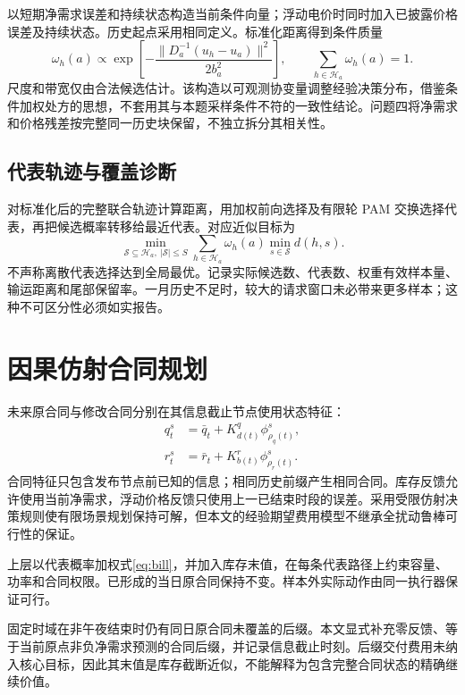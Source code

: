 \documentclass[UTF8,a4paper,zihao=-4,fontset=mac]{ctexart}
\begin{document}
以短期净需求误差和持续状态构造当前条件向量；浮动电价时同时加入已披露价格误差及持续状态。历史起点采用相同定义。标准化距离得到条件质量
\begin{equation}
\omega_h(a)\propto\exp\left[-\frac{\|D_a^{-1}(u_h-u_a)\|^2}{2b_a^2}\right],\qquad
\sum_{h\in\mathcal H_a}\omega_h(a)=1.
\end{equation}
尺度和带宽仅由合法候选估计。该构造以可观测协变量调整经验决策分布，借鉴条件加权处方的思想\cite{bertsimas}，不套用其与本题采样条件不符的一致性结论。问题四将净需求和价格残差按完整同一历史块保留，不独立拆分其相关性。

\subsection{代表轨迹与覆盖诊断}
对标准化后的完整联合轨迹计算距离，用加权前向选择及有限轮 PAM 交换选择代表，再把候选概率转移给最近代表。对应近似目标为
\begin{equation}
\min_{\mathcal S\subseteq\mathcal H_a,\ |\mathcal S|\le S}
\sum_{h\in\mathcal H_a}\omega_h(a)\min_{s\in\mathcal S}d(h,s).
\end{equation}
不声称离散代表选择达到全局最优。记录实际候选数、代表数、权重有效样本量、输运距离和尾部保留率。一月历史不足时，较大的请求窗口未必带来更多样本；这种不可区分性必须如实报告。

\section{因果仿射合同规划}
未来原合同与修改合同分别在其信息截止节点使用状态特征：
\begin{align}
q_t^s&=\bar q_t+K_{d(t)}^q\phi_{\rho_q(t)}^s,\\
r_t^s&=\bar r_t+K_{b(t)}^r\phi_{\rho_r(t)}^s.
\end{align}
合同特征只包含发布节点前已知的信息；相同历史前缀产生相同合同。库存反馈允许使用当前净需求，浮动价格反馈只使用上一已结束时段的误差。采用受限仿射决策规则\cite{bental}使有限场景规划保持可解，但本文的经验期望费用模型不继承全扰动鲁棒可行性的保证。

上层以代表概率加权式\eqref{eq:bill}，并加入库存末值，在每条代表路径上约束容量、功率和合同权限。已形成的当日原合同保持不变。样本外实际动作由同一执行器保证可行。

固定时域在非午夜结束时仍有同日原合同未覆盖的后缀。本文显式补充零反馈、等于当前原点非负净需求预测的合同后缀，并记录信息截止时刻。后缀交付费用未纳入核心目标，因此其末值是库存截断近似，不能解释为包含完整合同状态的精确继续价值。
\end{document}
